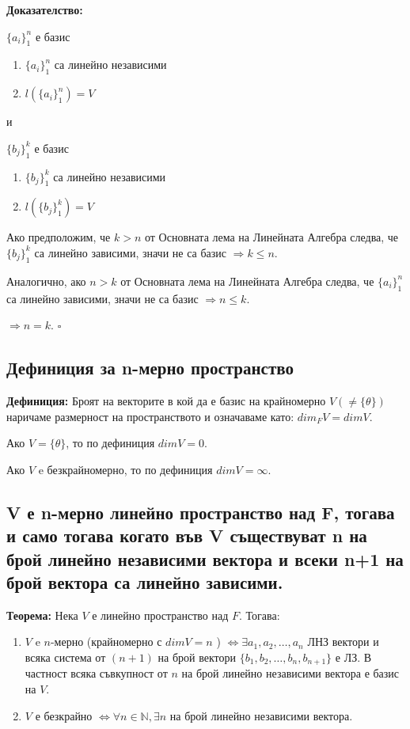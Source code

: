 \documentclass[fleqn,12pt]{article}
\begin{document}
\begin{flushleft}
\vspace{5mm}

\textbf{Доказателство:}

$ \{a_i\}_1^n $ е базис
\begin{enumerate}
    \item $\{a_i\}_1^n $ са линейно независими
    \item $ l(\{a_i\}_1^n) = V $
\end{enumerate}

и

$ \{b_j\}_1^k $ е базис
\begin{enumerate}
    \item $\{b_j\}_1^k $ са линейно независими
    \item $ l(\{b_j\}_1^k) = V $
\end{enumerate}

Ако предположим, че $k > n $ от Основната лема на Линейната Алгебра следва, че $ \{b_j\}_1^k $ са линейно зависими, значи не са базис $\Rightarrow k \leq n $.

Аналогично, ако $n > k $ от Основната лема на Линейната Алгебра следва, че $ \{a_i\}_1^n $ са линейно зависими, значи не са базис $\Rightarrow n \leq k $.

$\Rightarrow n = k$. $\square$

\subsection{Дефиниция за n-мерно пространство}
\textbf{Дефиниция:} Броят на векторите в кой да е базис на крайномерно $V ( \neq \{\theta\}) $ наричаме размерност на пространството и означаваме като: $dim_F V = dimV$.

Ако $V = \{\theta\} $, то по дефиниция $ dimV = 0$.

Ако $V$ e безкрайномерно, то по дефиниция $ dimV = \infty$.

\subsection{V е n-мерно
линейно пространство над F, тогава и само тогава когато във V съществуват n на
брой линейно независими вектора и всеки n+1 на брой вектора са линейно
зависими.}
\textbf{Теорема:} Нека $V$ е линейно пространство над $F$. Тогава:
\begin{enumerate}
\item $V$ e $n$-мерно (крайномерно с $dimV = n$ ) $\iff$$ \exists a_1, a_2, \dots, a_n $ ЛНЗ вектори и всяка система от $(n+1)$ на брой вектори $\{b_1, b_2, \dots, b_n, b_{n+1}\}$ е ЛЗ. В частност всяка съвкупност от $n$ на брой линейно независими вектора е базис на $V$.
\item $V$ е безкрайно $ \iff  \forall n \in \mathbb{N}, \exists n $ на брой линейно независими вектора.
\end{enumerate}


\end{flushleft}
\end{document}
